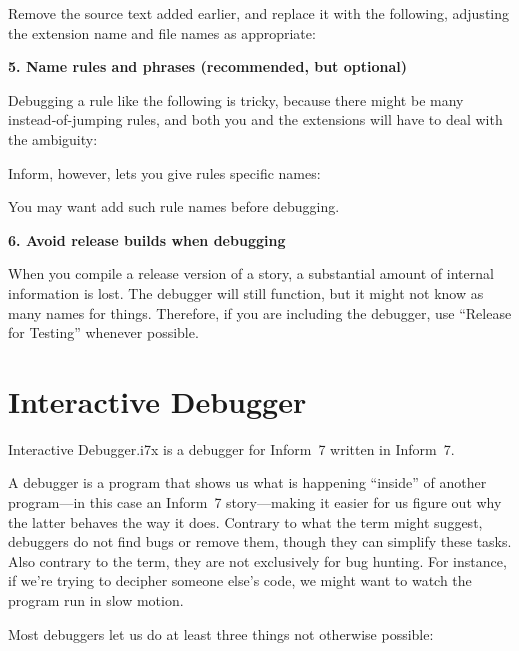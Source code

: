\documentclass{book}
\newcommand{\lastpagebreak}{\vfill\pagebreak}
\newcommand{\impatiencechapter}[1]{\chapter{#1}\addcontentsline{toi}{chapter}{#1}}
\begin{document}
Remove the source text added earlier, and replace it with the following,
adjusting the extension name and file names as appropriate:

\begin{quote}
  
\end{quote}

\lastpagebreak

\textbf{5. Name rules and phrases (recommended, but optional)}

Debugging a rule like the following is tricky, because there might be many
instead-of-jumping rules, and both you and the extensions will have to deal with
the ambiguity:

\begin{quote}
  
\end{quote}

Inform, however, lets you give rules specific names:

\begin{quote}
  
\end{quote}

You may want add such rule names before debugging.

\textbf{6. Avoid release builds when debugging}

When you compile a release version of a story, a substantial amount of internal
information is lost.  The debugger will still function, but it might not know as
many names for things.  Therefore, if you are including the debugger, use
``Release for Testing'' whenever possible.

\lastpagebreak

\impatiencechapter{Interactive Debugger}
\label{interactive-debugger}

Interactive Debugger.i7x is a debugger for Inform~7 written in Inform~7.

\label{what}
A debugger is a program that shows us what is happening ``inside'' of another
program---in this case an Inform~7 story---making it easier for us figure out
why the latter behaves the way it does.  Contrary to what the term might
suggest, debuggers do not find bugs or remove them, though they can simplify
these tasks.  Also contrary to the term, they are not exclusively for bug
hunting.  For instance, if we're trying to decipher someone else's code, we
might want to watch the program run in slow motion.

Most debuggers let us do at least three things not otherwise possible:
\end{document}

